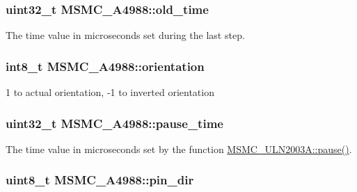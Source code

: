 \hypertarget{class_m_s_m_c___a4988_a60ff02342382a71526d14fb9e51ddc2a}{
\subsubsection[{old\+\_\+time}]{\setlength{\rightskip}{0pt plus 5cm}uint32\+\_\+t M\+S\+M\+C\+\_\+\+A4988\+::old\+\_\+time\hspace{0.3cm}{\ttfamily [private]}}}\label{class_m_s_m_c___a4988_a60ff02342382a71526d14fb9e51ddc2a}


The time value in microseconds set during the last step. 

\hypertarget{class_m_s_m_c___a4988_a81bb2d2035011573f68c7a2c66bc5bc2}{
\subsubsection[{orientation}]{\setlength{\rightskip}{0pt plus 5cm}int8\+\_\+t M\+S\+M\+C\+\_\+\+A4988\+::orientation\hspace{0.3cm}{\ttfamily [private]}}}\label{class_m_s_m_c___a4988_a81bb2d2035011573f68c7a2c66bc5bc2}


1 to actual orientation, -\/1 to inverted orientation 

\hypertarget{class_m_s_m_c___a4988_a3c4854c40c6d9db5e37698eea2debd70}{
\subsubsection[{pause\+\_\+time}]{\setlength{\rightskip}{0pt plus 5cm}uint32\+\_\+t M\+S\+M\+C\+\_\+\+A4988\+::pause\+\_\+time\hspace{0.3cm}{\ttfamily [private]}}}\label{class_m_s_m_c___a4988_a3c4854c40c6d9db5e37698eea2debd70}


The time value in microseconds set by the function \hyperlink{class_m_s_m_c___u_l_n2003_a_aa1d3444465d59ca6c87f05f565dde4a2}{M\+S\+M\+C\+\_\+\+U\+L\+N2003\+A\+::pause()}. 

\hypertarget{class_m_s_m_c___a4988_a2bc9676a272bcd6604aaf8b08ac07109}{
\subsubsection[{pin\+\_\+dir}]{\setlength{\rightskip}{0pt plus 5cm}uint8\+\_\+t M\+S\+M\+C\+\_\+\+A4988\+::pin\+\_\+dir\hspace{0.3cm}{\ttfamily [private]}}}\label{class_m_s_m_c___a4988_a2bc9676a272bcd6604aaf8b08ac07109}



